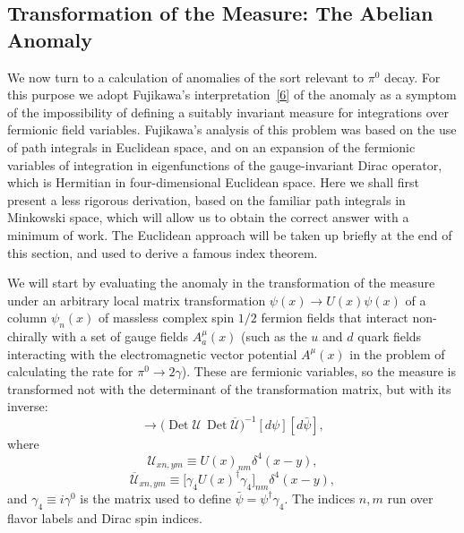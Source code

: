 \subsection{Transformation of the Measure: The Abelian Anomaly}
\label{sec:22.2}

We now turn to a calculation of anomalies of the sort relevant to $\pi^0$
decay. For this purpose we adopt Fujikawa's
interpretation~\hyperref[ch22-ref-6]{[6]} of the anomaly as a symptom of
the impossibility of defining a suitably invariant measure for integrations
over fermionic field variables. Fujikawa's analysis of this problem was
based on the use of path integrals in Euclidean space, and on an expansion
of the fermionic variables of integration in eigenfunctions of the
gauge-invariant Dirac operator, which is Hermitian in four-dimensional
Euclidean space. Here we shall first present a less rigorous derivation,
based on the familiar path integrals in Minkowski space, which will allow
us to obtain the correct answer with a minimum of work. The Euclidean
approach will be taken up briefly at the end of this section, and used to
derive a famous index theorem.

We will start by evaluating the anomaly in the transformation of the
measure under an arbitrary local matrix transformation
$\psi(x)\to U(x)\psi(x)$ of a column $\psi_n(x)$ of massless complex spin
$1/2$ fermion fields that interact non-chirally with a set of gauge fields
$A_a^\mu(x)$ (such as the $u$ and $d$ quark fields interacting with
the electromagnetic vector potential $A^\mu(x)$ in the problem of
calculating the rate for $\pi^0\to2\gamma$). These are fermionic variables,
so the measure is transformed not with the determinant of the
transformation matrix, but with its inverse:
\begin{equation}
 [d\psi][d\bar\psi]\longrightarrow
 \bigl(\operatorname{Det}\mathcal U\,
       \operatorname{Det}\overline{\mathcal U}\bigr)^{-1}
 [d\psi][d\bar\psi],
 \tag{22.2.1}\label{eq:22.2.1}
\end{equation}
where
\begin{equation}
 \mathcal U_{xn,ym}\equiv U(x)_{nm}\delta^4(x-y),
 \tag{22.2.2}\label{eq:22.2.2}
\end{equation}
\begin{equation}
 \overline{\mathcal U}_{xn,ym}
 \equiv\bigl[\gamma_4U(x)^\dagger\gamma_4\bigr]_{nm}\delta^4(x-y),
 \tag{22.2.3}\label{eq:22.2.3}
\end{equation}
and $\gamma_4\equiv i\gamma^0$ is the matrix used to define
$\bar\psi=\psi^\dagger\gamma_4$. The indices $n,m$ run over flavor labels
and Dirac spin indices.

